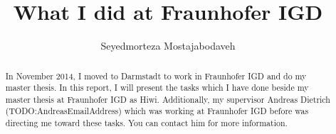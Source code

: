 \documentclass[]{report}
\title{What I did at Fraunhofer IGD}
\author{Seyedmorteza Mostajabodaveh}
\begin{document}
\maketitle

\begin{abstract}
In November 2014, I moved to Darmstadt to work in Fraunhofer IGD and do my master thesis. In this report, I will present the tasks which I have done beside my master thesis at Fraunhofer IGD as Hiwi. Additionally, my supervisor Andreas Dietrich (TODO:AndreasEmailAddress) which was working at Fraunhofer IGD before was directing me toward these tasks. You can contact him for more information.
\end{abstract}

\begin{figure}[!ht]
	\hfill
	\hfill
	\hfill
	\hfill
\end{figure}
\end{document}
